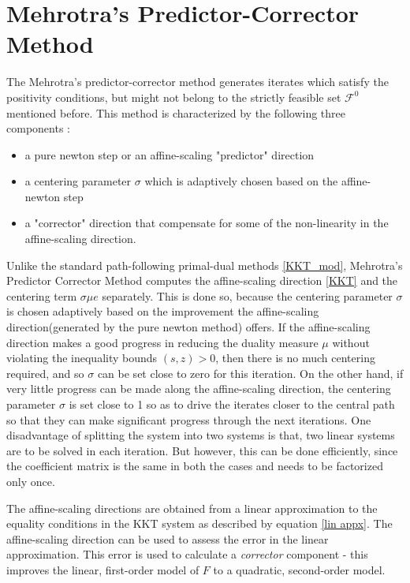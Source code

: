 \section{Mehrotra's Predictor-Corrector Method}
The Mehrotra's predictor-corrector method\cite{mehrotra1992implementation} generates iterates which satisfy the positivity conditions, but might not belong to the strictly feasible set $\mathcal{F}^0$ mentioned before. This method is characterized by the following three components\cite{wright1997primal} :
\begin{itemize}
    \item a pure newton step or an affine-scaling "predictor" direction
    \item a centering parameter $\sigma$ which is adaptively chosen based on the affine-newton step
    \item a "corrector" direction that compensate for some of the non-linearity in the affine-scaling direction.
\end{itemize}
\par Unlike the standard path-following primal-dual methods \ref{KKT_mod}, Mehrotra's Predictor Corrector Method computes the affine-scaling direction \ref{KKT} and the centering term $\sigma \mu e$ separately. This is done so, because the centering parameter $\sigma$ is chosen adaptively based on the improvement the affine-scaling direction(generated by the pure newton method) offers. If the affine-scaling direction makes a good progress in reducing the duality measure $\mu$ without violating the inequality bounds $(s,z)>0$, then there is no much centering required, and so $\sigma$ can be set close to zero for this iteration. On the other hand, if very little progress can be made along the affine-scaling direction, the centering parameter $\sigma$ is set close to 1 so as to drive the iterates closer to the central path so that they can make significant progress through the next iterations. One disadvantage of splitting the system into two systems is that, two linear systems are to be solved in each iteration. But however, this can be done efficiently, since the coefficient matrix is the same in both the cases and needs to be factorized only once.
\par The affine-scaling directions are obtained from a linear approximation to the equality conditions in the KKT system as described by equation \ref{lin appx}. The affine-scaling direction can be used to assess the error in the linear approximation. This error is used to calculate a \textit{corrector }component - this improves the linear, first-order model of $F$ to a quadratic, second-order model. 
